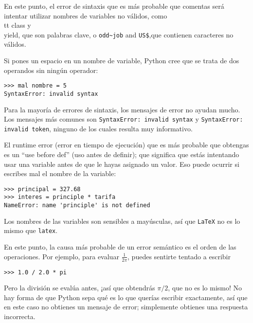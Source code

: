 En este punto, el error de sintaxis que es más probable que comentas será
intentar utilizar nombres de variables no válidos, como {\\tt class} y {\\ yield}, que
son palabras clave, o \verb"odd~job" and \verb"US$",que contienen
caracteres no válidos.


Si pones un espacio en un nombre de variable, Python cree que se trata
de dos operandos sin ningún operador:

\beforeverb
\begin{verbatim}
>>> mal nombre = 5
SyntaxError: invalid syntax
\end{verbatim}
\afterverb
%
Para la mayoría de errores de sintaxis, los mensajes de error no ayudan mucho.
Los mensajes más comunes son {\tt SyntaxError: invalid syntax} y
{\tt SyntaxError: invalid token}, ninguno de los cuales resulta muy informativo.


El runtime error (error en tiempo de ejecución) que es más probable que obtengas es un
``use before def'' (uso antes de definir); que significa que estás intentando usar una variable
antes de que le hayas asignado un valor. Eso puede ocurrir si escribes mal el nombre de la variable: 

\beforeverb
\begin{verbatim}
>>> principal = 327.68
>>> interes = principle * tarifa
NameError: name 'principle' is not defined
\end{verbatim}
\afterverb
%
Los nombres de las variables son sensibles a mayúsculas, así que {\tt LaTeX} no es
lo mismo que {\tt latex}.


En este punto, la causa más probable de un error semántico es
el orden de las operaciones. Por ejemplo, para evaluar $\frac{1}{2 \pi}$,
puedes sentirte tentado a escribir

\beforeverb
\begin{verbatim}
>>> 1.0 / 2.0 * pi
\end{verbatim}
\afterverb
%
Pero la división se evalúa antes, ¡así que obtendrás $\pi / 2$, que
no es lo mismo! No hay forma de que Python
sepa qué es lo que querías escribir exactamente, así que en este caso no
obtienes un mensaje de error; simplemente obtienes una respuesta incorrecta.

